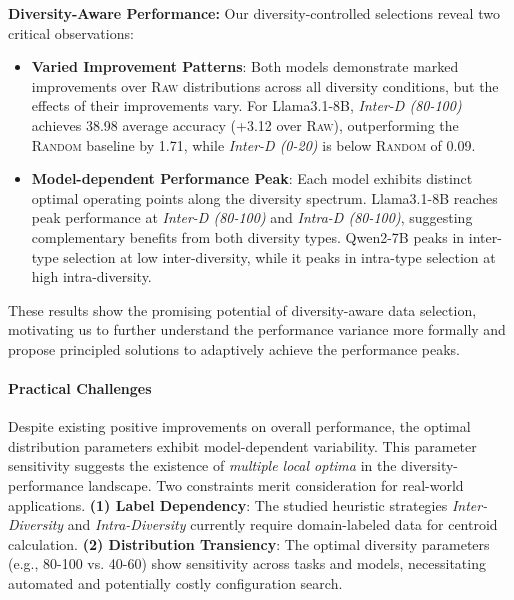\textbf{Diversity-Aware Performance:} Our diversity-controlled selections reveal two critical observations:
\begin{itemize}[leftmargin=*]
   \item \textbf{Varied Improvement Patterns}: 
   Both models demonstrate marked improvements over \textsc{Raw} distributions across all diversity conditions, but the effects of their improvements vary.
   For Llama3.1-8B, \textit{Inter-D (80-100)} achieves 38.98 average accuracy (+3.12 over \textsc{Raw}), outperforming the \textsc{Random} baseline by 1.71, while \textit{Inter-D (0-20)} is below \textsc{Random} of 0.09.

    \item \textbf{Model-dependent Performance Peak}: 
    Each model exhibits distinct optimal operating points along the diversity spectrum. Llama3.1-8B reaches peak performance at \textit{Inter-D (80-100)} and \textit{Intra-D (80-100)}, suggesting complementary benefits from both diversity types. 
    Qwen2-7B peaks in inter-type selection at low inter-diversity, while it peaks in intra-type selection at high intra-diversity.
\end{itemize}

These results show the promising potential of diversity-aware data selection, motivating us to further understand the performance variance more formally and propose principled solutions to adaptively achieve the performance peaks.

\paragraph{Practical Challenges}
Despite existing positive improvements on overall performance, the optimal distribution parameters exhibit model-dependent variability. This parameter sensitivity suggests the existence of \textit{multiple local optima} in the diversity-performance landscape. Two constraints merit consideration for real-world applications. \textbf{(1) Label Dependency}: The studied heuristic strategies \textit{Inter-Diversity} and \textit{Intra-Diversity} currently require domain-labeled data for centroid calculation. \textbf{(2) Distribution Transiency}: The optimal diversity parameters (e.g., 80-100 vs. 40-60) show sensitivity across tasks and models, necessitating automated and potentially costly configuration search.


